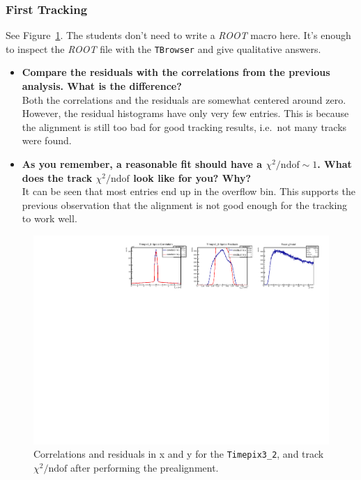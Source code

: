 \documentclass[a4paper,11pt]{article}
\newcommand*{\cernroot}{\emph{ROOT}\xspace}
\newcommand*{\code}[1]{\texttt{#1}}
\begin{document}
\subsubsection{First Tracking}
See Figure~\ref{fig:06_first_tracking}.
The students don't need to write a \cernroot macro here.
It's enough to inspect the \cernroot file with the \code{TBrowser} and give qualitative answers.
\begin{itemize}
\item \textbf{Compare the residuals with the correlations from the previous analysis. What is the difference?}\\
Both the correlations and the residuals are somewhat centered around zero.
However, the residual histograms have only very few entries.
This is because the alignment is still too bad for good tracking results, i.e.~not many tracks were found.
\item \textbf{As you remember, a reasonable fit should have a $\chi^2/\text{ndof} \sim 1$.
What does the track $\chi^2/\text{ndof}$ look like for you? Why?}\\
It can be seen that most entries end up in the overflow bin.
This supports the previous observation that the alignment is not good enough for the tracking to work well.
\end{itemize}

\begin{figure}[!htb]
\centering
\includegraphics[width=\textwidth]{06_first_tracking}
\caption{Correlations and residuals in x and y for the \code{Timepix3\_2}, and track $\chi^2/\text{ndof}$ after performing the prealignment.}
\label{fig:06_first_tracking}
\end{figure}
\end{document}
